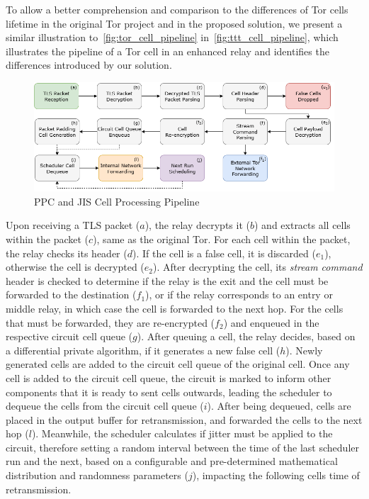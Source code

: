 To allow a better comprehension and comparison to the differences of Tor cells lifetime in the original Tor project and in the proposed solution, we present a similar illustration to~\autoref{fig:tor_cell_pipeline} in~\autoref{fig:ttt_cell_pipeline}, which illustrates the pipeline of a Tor cell in an enhanced relay and identifies the differences introduced by our solution.
\begin{figure}[!h]
  \centering
  \includegraphics[width=\textwidth]{Chapters/Figures/Solution_Cell_Pipeline.png}
  \caption{PPC and JIS Cell Processing Pipeline}\label{fig:ttt_cell_pipeline}
\end{figure}

Upon receiving a TLS packet (\(a\)), the relay decrypts it (\(b\)) and extracts all cells within the packet (\(c\)), same as the original Tor. For each cell within the packet, the relay checks its header (\(d\)). If the cell is a false cell, it is discarded (\(e_1\)), otherwise the cell is decrypted (\(e_2\)). After decrypting the cell, its \textit{stream command} header is checked to determine if the relay is the exit and the cell must be forwarded to the destination (\(f_1\)), or if the relay corresponds to an entry or middle relay, in which case the cell is forwarded to the next hop. For the cells that must be forwarded, they are re-encrypted (\(f_2\)) and enqueued in the respective circuit cell queue (\(g\)). After queuing a cell, the relay decides, based on a differential private algorithm, if it generates a new false cell (\(h\)). Newly generated cells are added to the circuit cell queue of the original cell. Once any cell is added to the circuit cell queue, the circuit is marked to inform other components that it is ready to sent cells outwards, leading the scheduler to dequeue the cells from the circuit cell queue (\(i\)). After being dequeued, cells are placed in the output buffer for retransmission, and forwarded the cells to the next hop (\(l\)). Meanwhile, the scheduler calculates if jitter must be applied to the circuit, therefore setting a random interval between the time of the last scheduler run and the next, based on a configurable and pre-determined mathematical distribution and randomness parameters (\(j\)), impacting the following cells time of retransmission. 

